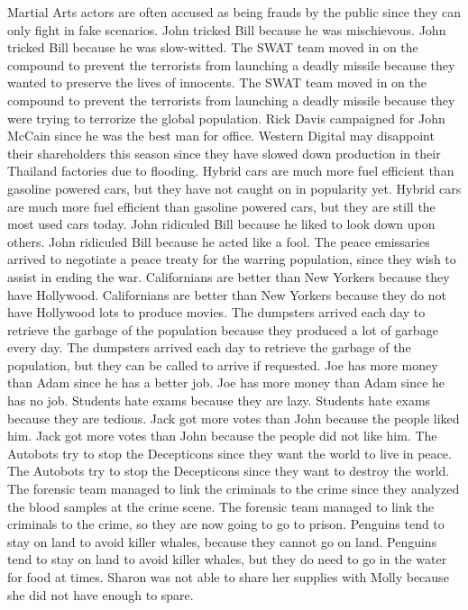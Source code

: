 \documentclass{article}
\begin{document}
\begin{enumerate}
	Martial Arts actors are often accused as being frauds by the public since they can only fight in fake scenarios.
	John tricked Bill because he was mischievous.
	John tricked Bill because he was slow-witted.
	The SWAT team moved in on the compound to prevent the terrorists from launching a deadly missile because they wanted to preserve the lives of innocents.
	The SWAT team moved in on the compound to prevent the terrorists from launching a deadly missile because they were trying to terrorize the global population.
	Rick Davis campaigned for John McCain since he was the best man for office.
	Western Digital may disappoint their shareholders this season since they have slowed down production in their Thailand factories due to flooding.
	Hybrid cars are much more fuel efficient than gasoline powered cars, but they have not caught on in popularity yet.
	Hybrid cars are much more fuel efficient than gasoline powered cars, but they are still the most used cars today.
	John ridiculed Bill because he liked to look down upon others.
	John ridiculed Bill because he acted like a fool.
	The peace emissaries arrived to negotiate a peace treaty for the warring population, since they wish to assist in ending the war.
	Californians are better than New Yorkers because they have Hollywood.
	Californians are better than New Yorkers because they do not have Hollywood lots to produce movies.
	The dumpsters arrived each day to retrieve the garbage of the population because they produced a lot of garbage every day.
	The dumpsters arrived each day to retrieve the garbage of the population, but they can be called to arrive if requested.
	Joe has more money than Adam since he has a better job.
	Joe has more money than Adam since he has no job.
	Students hate exams because they are lazy.
	Students hate exams because they are tedious.
	Jack got more votes than John because the people liked him.
	Jack got more votes than John because the people did not like him.
	The Autobots try to stop the Decepticons since they want the world to live in peace.
	The Autobots try to stop the Decepticons since they want to destroy the world.
	The forensic team managed to link the criminals to the crime since they analyzed the blood samples at the crime scene.
	The forensic team managed to link the criminals to the crime, so they are now going to go to prison.
	Penguins tend to stay on land to avoid killer whales, because they cannot go on land.
	Penguins tend to stay on land to avoid killer whales, but they do need to go in the water for food at times.
	Sharon was not able to share her supplies with Molly because she did not have enough to spare.

\end{enumerate}
\end{document}
